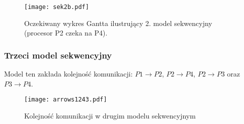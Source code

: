 \begin{figure}[!ht]
\centering
\texttt{[image: sek2b.pdf]}
\caption{Oczekiwany wykres Gantta ilustrujący 2. model sekwencyjny (procesor P2 czeka na P4).}
\label{fig:seq2b}
\end{figure}

\subsubsection{Trzeci model sekwencyjny}

Model ten zakłada kolejność komunikacji: $P1 \to P2$, $P2 \to P4$, $P2 \to P3$ oraz $P3 \to P4$. \\

\begin{figure}[!ht]
\centering
\texttt{[image: arrows1243.pdf]}
\caption{Kolejność komunikacji w drugim modelu sekwencyjnym}
\label{fig:seq3}
\end{figure}

